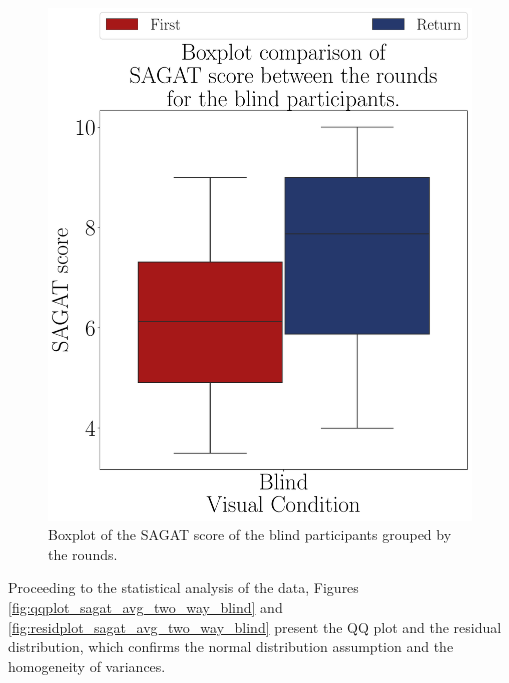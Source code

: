 \begin{figure}[!htb]
\begin{minipage}{0.45\textwidth}
        \includegraphics[width = \textwidth]{Resultados/Sagat/Figuras/pdf/boxplot_sagat_blind_rounds.pdf}
        \caption{Boxplot of the SAGAT score of the blind participants grouped by the rounds.}
        \label{fig:boxplot_sagat_blind_rounds}
    \end{minipage}
\end{figure}

Proceeding to the statistical analysis of the data, Figures \ref{fig:qqplot_sagat_avg_two_way_blind} and \ref{fig:residplot_sagat_avg_two_way_blind} present the QQ plot and the residual distribution, which confirms the normal distribution assumption and the homogeneity of variances.

